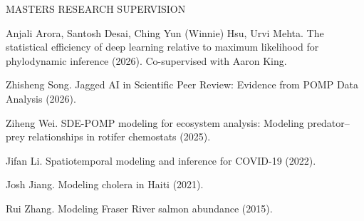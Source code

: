 \lsp

\begin{reflist}{MASTERS RESEARCH SUPERVISION}
  \item Anjali Arora, Santosh Desai, Ching Yun (Winnie) Hsu, Urvi Mehta. The statistical efficiency of deep learning relative to maximum likelihood for phylodynamic inference (2026). Co-supervised with Aaron King.
\item  Zhisheng Song. Jagged AI in Scientific Peer Review: Evidence from POMP Data Analysis (2026).
\item{Ziheng Wei}. SDE-POMP modeling for ecosystem analysis: Modeling predator–prey relationships in rotifer chemostats (2025).
\item{Jifan Li}. Spatiotemporal modeling and inference for COVID-19 (2022).
\item{Josh Jiang}. Modeling cholera in Haiti (2021).
\item{Rui Zhang}. Modeling Fraser River salmon abundance (2015).
\end{reflist}

